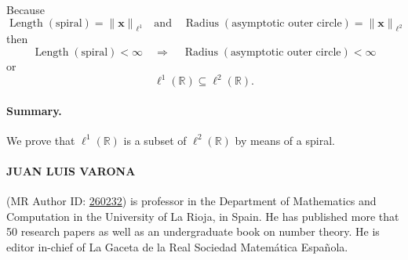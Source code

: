 \documentclass[10pt, a4paper]{article}
\newcounter{lineas}
\begin{document}
\begin{center}
\end{center} 


Because
\[
  \operatorname{Length}(\text{spiral}) = {\|\mathbf{x}\|}_{\ell^1}
  \quad\text{and}\quad
  \operatorname{Radius}(\text{asymptotic outer circle}) = {\|\mathbf{x}\|}_{\ell^2}
\]
then
\[
  \operatorname{Length}(\text{spiral}) < \infty
  \quad\Rightarrow\quad \operatorname{Radius}(\text{asymptotic outer circle}) < \infty
\]
or
\[
  \ell^1(\mathbb{R}) \subseteq \ell^2(\mathbb{R}).
\]

\bigskip

\begin{small}
\paragraph{Summary.} We prove that $\ell^1(\mathbb{R})$ is a subset of $\ell^2(\mathbb{R})$ by means of a spiral.\par
\end{small}

\enlargethispage{0.5cm}

\begin{small}
\paragraph{JUAN LUIS VARONA\hspace{-1em} }
(MR Author ID: \href{http://www.ams.org/mathscinet/MRAuthorID/260232}{260232}) is professor in the Department of Mathematics and Computation in the University of La Rioja, in Spain. He has published more that 50 research papers as well as an undergraduate book on number theory. He is editor in-chief of La Gaceta de la Real Sociedad Matem\'atica Espa\~nola.\par
\end{small}

\vfill


\end{document}
